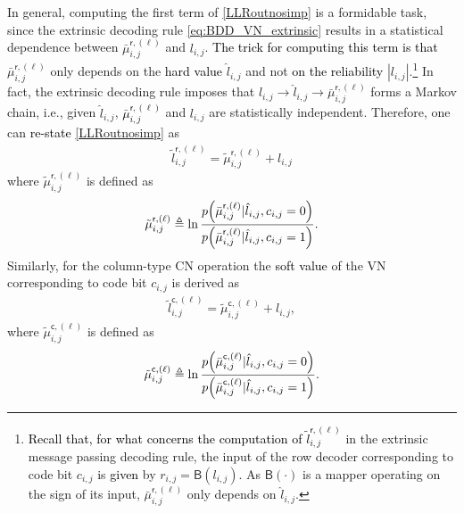 \documentclass[journal]{IEEEtran}
\newcommand{\row}{\mathsf{r}}
\newcommand{\col}{\mathsf{c}}
\newcommand{\BB}{\mathsf{B}}
\newcommand{\mut}{\tilde{\mu}}
\newcommand{\opt}{\tilde{l}}
\newcommand{\SH}{\textcolor{black}}
\newcommand{\GL}{\textcolor{black}}
\newcommand{\AG}{\textcolor{black}}
\let\originalleft\left
\let\originalright\right
\renewcommand{\left}{\mathopen{}\mathclose\bgroup\originalleft}
\renewcommand{\right}{\aftergroup\egroup\originalright}
\begin{document}
In general, computing the first term of \eqref{LLRoutnosimp} is a formidable task, since the extrinsic decoding rule \eqref{eq:BDD_VN_extrinsic} results in a statistical dependence between $\bar \mu _{i,j}^{\row,(\ell )}$ and $l_{i,j}$. \AG{The trick for computing  this term is that} $\bar \mu _{i,j}^{\row,(\ell )}$ only depends on the \GL{hard value} $\hat l_{i,j}$ and not \GL{on the reliability} $|l_{i,j}|$.\footnote{\GL{Recall that, for what concerns the computation of $\opt_{i,j}^{\row,(\ell )}$} in the extrinsic message passing decoding rule, the input of the row decoder corresponding to code bit $c_{i,j}$ is \GL{given} by $r_{i,j}=\BB(l_{i,j})$. As $\BB(\cdot)$ is a mapper operating on the sign of its input, $\bar \mu _{i,j}^{\row,(\ell )}$ only depends on $\hat l_{i,j}$.} In fact, the extrinsic decoding rule imposes that $l_{i,j} \to \hat l_{i,j} \to \bar \mu _{i,j}^{\row,(\ell )}$ forms a Markov chain, i.e., given $\hat l_{i,j}$, \SH{$\bar \mu _{i,j}^{\row,(\ell )}$} and $l_{i,j}$ are statistically independent. Therefore, one can \GL{re-state} \eqref{LLRoutnosimp} as
\begin{align}\label{LLRoutv1} 
\opt_{i,j}^{\row,(\ell )} = \mut_{i,j}^{\row,(\ell )} + l_{i,j}
\end{align}      
where $\mut_{i,j}^{\row,(\ell )}$ is defined as
\begin{align}\label{mutild_r} 
\mut_{i,j}^{\row,(\ell )}\triangleq\ln \frac{{p\left( {\bar \mu _{i,j}^{\row,(\ell )}|{\hat l_{i,j}},{c_{i,j}} = 0} \right)}}{{p\left( {\bar \mu _{i,j}^{\row,(\ell )}|{\hat l_{i,j}},{c_{i,j}} = 1} \right)}}.
\end{align}  
Similarly, for the column-type CN operation the \GL{soft value} of the VN corresponding to code bit $c_{i,j}$ is derived as 
\begin{align}\label{LLRoutv1_col} 
\opt_{i,j}^{\col,(\ell )} = \mut_{i,j}^{\col,(\ell )} + l_{i,j}, 
\end{align}    
where $\mut_{i,j}^{\col,(\ell )}$ is defined as
\begin{align}\label{mutild_c} 
\mut_{i,j}^{\col,(\ell )}\triangleq\ln \frac{{p\left( {\bar \mu _{i,j}^{\col,(\ell )}|{\hat l_{i,j}},{c_{i,j}} = 0} \right)}}{{p\left( {\bar \mu _{i,j}^{\col,(\ell )}|{\hat l_{i,j}},{c_{i,j}} = 1} \right)}}.
\end{align} 
\end{document}
